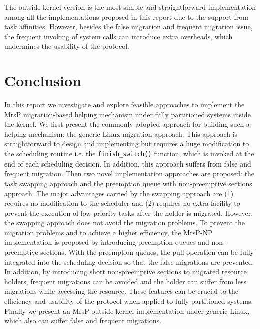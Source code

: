 \documentclass{report}
\begin{document}
The outside-kernel version is the most simple and straightforward implementation among all the implementations proposed in this report due to the support from task affinities. However, besides the false migration and frequent migration issue, the frequent invoking of system calls can introduce extra overheads, which undermines the usability of the protocol.



\chapter{Conclusion}
\label{Conclusion}
In this report we investigate and explore feasible approaches to implement the MrsP migration-based helping mechanism under fully partitioned systems inside the kernel. We first present the commonly adopted approach for building such a helping mechanism: the generic Linux migration approach. This approach is straightforward to design and implementing but requires a huge modification to the scheduling routine i.e. the \texttt{finish\_switch()} function, which is invoked at the end of each scheduling decision. In addition, this approach suffers from false and frequent migration. Then two novel implementation approaches are proposed: the task swapping approach and the  preemption queue with non-preemptive sections approach. The major advantages carried by the swapping approach are (1) requires no modification to the scheduler and (2) requires no extra facility to prevent the execution of low priority tasks after the holder is migrated. However, the swapping approach does not avoid the migration problems. To prevent the migration problems and to achieve a higher efficiency, the MrsP-NP implementation is proposed by introducing preemption queues and non-preemptive sections. With the preemption queues, the pull operation can be fully integrated into the scheduling decision so that the false migrations are prevented. In addition, by introducing short non-preemptive sections to migrated resource holders, frequent migrations can be avoided and the holder can suffer from less migrations while accessing the resource. These features can be crucial to the efficiency and usability of the protocol when applied to fully partitioned systems. Finally we present an MrsP outside-kernel implementation under generic Linux, which also can suffer false and frequent migrations.




\end{document}

